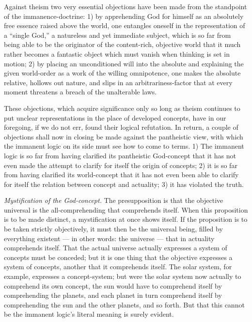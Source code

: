 \documentclass[12pt]{book}
\begin{document}
Against theism two very essential objections have been made from the
standpoint of the immanence-doctrine: 1) by apprehending God for
himself as an absolutely free essence raised above the world, one
entangles oneself in the representation of a ``single God,'' a
natureless and yet immediate subject, which is so far from being
able to be the originator of the content-rich, objective world that
it much rather becomes a fantastic object which must vanish when
thinking is set in motion; 2) by placing an unconditioned will into
the absolute and explaining the given world-order as a work of the
willing omnipotence, one makes the absolute relative, hollows out
nature, and slips in an arbitrariness-factor that at every moment
threatens a breach of the unalterable laws.

These objections, which acquire significance only so long as theism
continues to put unclear representations in the place of
developed concepts, have in our foregoing, if we do not err, found
their logical refutation. In return, a couple of objections shall
now in closing be made against the pantheistic view, with which the
immanent logic on its side must see how to come to terms. 1) The
immanent logic is so far from having clarified its pantheistic
God-concept that it has not even made the attempt to clarify for
itself the origin of concepts; 2) it is so far from having clarified
its world-concept that it has not even been able to clarify for
itself the relation between concept and actuality; 3) it has
violated the truth.

\emph{Mystification of the God-concept.} The presupposition is that
the objective universal is the all-comprehending that comprehends
itself. When this proposition is to be made distinct, a
mystification at once shows itself. If the proposition is to be
taken strictly objectively, it must then be the universal being,
filled by everything existent --- in other words: the universe ---
that in actuality comprehends itself. That the actual universe
actually expresses a system of concepts must be conceded; but it is
one thing that the objective expresses a system of concepts, another
that it comprehends itself. The solar system, for example, expresses
a concept-system; but were the solar system now actually to
comprehend its own concept, the sun would have to comprehend itself
by comprehending the planets, and each planet in turn comprehend
itself by comprehending the sun and the other planets, and so forth.
But that this cannot be the immanent logic's literal meaning is
surely evident.
\end{document}

